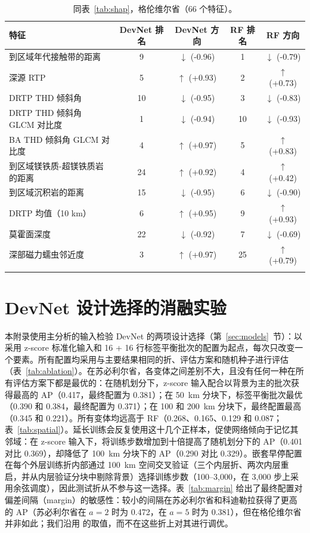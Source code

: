 \documentclass[pdflatex,sn-apa]{sn-jnl}
\begin{document}
\begin{appendices}
\begin{table}[!h]
\caption{同表~\ref{tab:shap}，格伦维尔省（66 个特征）。}\label{tab:shap-gren}
\footnotesize
\begin{tabular*}{\textwidth}{@{\extracolsep\fill}lcccc}
\toprule
特征 & DevNet 排名 & DevNet 方向 & RF 排名 & RF 方向 \\
\midrule
到区域年代接触带的距离 & 9 & $\downarrow$ (-0.96) & 1 & $\downarrow$ (-0.79) \\
深源 RTP & 5 & $\uparrow$ (+0.93) & 2 & $\uparrow$ (+0.73) \\
DRTP THD 倾斜角 & 10 & $\downarrow$ (-0.95) & 3 & $\downarrow$ (-0.83) \\
DRTP THD 倾斜角 GLCM 对比度 & 1 & $\downarrow$ (-0.94) & 10 & $\downarrow$ (-0.93) \\
BA THD 倾斜角 GLCM 对比度 & 4 & $\uparrow$ (+0.97) & 5 & $\uparrow$ (+0.83) \\
到区域镁铁质-超镁铁质岩的距离 & 24 & $\uparrow$ (+0.92) & 4 & $\uparrow$ (+0.42) \\
到区域沉积岩的距离 & 15 & $\downarrow$ (-0.95) & 6 & $\downarrow$ (-0.90) \\
DRTP 均值（10 km） & 6 & $\uparrow$ (+0.95) & 9 & $\uparrow$ (+0.93) \\
莫霍面深度 & 22 & $\downarrow$ (-0.92) & 7 & $\downarrow$ (-0.69) \\
深部磁力蠕虫邻近度 & 3 & $\uparrow$ (+0.97) & 25 & $\uparrow$ (+0.79) \\
\botrule
\end{tabular*}
\end{table}

\clearpage
\section{DevNet 设计选择的消融实验}\label{app:sensitivity}

本附录使用主分析的输入检验 DevNet 的两项设计选择（第~\ref{sec:models}~节）：以采用 z-score 标准化输入和 16 + 16 行标签平衡批次的配置为起点，每次只改变一个要素。所有配置均采用与主要结果相同的折、评估方案和随机种子进行评估（表~\ref{tab:ablation}）。在苏必利尔省，各变体之间差别不大，且没有任何一种在所有评估方案下都是最优的：在随机划分下，z-score 输入配合以背景为主的批次获得最高的 AP（0.417，最终配置为 0.381）；在 50~km 分块下，标签平衡批次最优（0.390 和 0.384，最终配置为 0.371）；在 100 和 200~km 分块下，最终配置最高（0.345 和 0.221）。所有变体均远高于 RF（0.268、0.165、0.129 和 0.087；表~\ref{tab:spatial}）。延长训练会反复使用这十几个正样本，促使网络倾向于记忆其邻域：在 z-score 输入下，将训练步数增加到十倍提高了随机划分下的 AP（0.401 对比 0.369），却降低了 100~km 分块下的 AP（0.290 对比 0.329）。嵌套早停配置在每个外层训练折内部通过 100~km 空间交叉验证（三个内层折、两次内层重启，并从内层验证分块中剔除背景）选择训练步数（100--3,000，在 3,000 步上采用余弦调度），因此测试折从不参与这一选择。表~\ref{tab:margin} 给出了最终配置对偏差间隔（margin）的敏感性：较小的间隔在苏必利尔省和科迪勒拉获得了更高的 AP（苏必利尔省在 $a = 2$ 时为 0.472，在 $a = 5$ 时为 0.381），但在格伦维尔省并非如此；我们沿用 \citet{Pang2019} 的取值，而不在这些折上对其进行调优。


\end{appendices}
\end{document}
